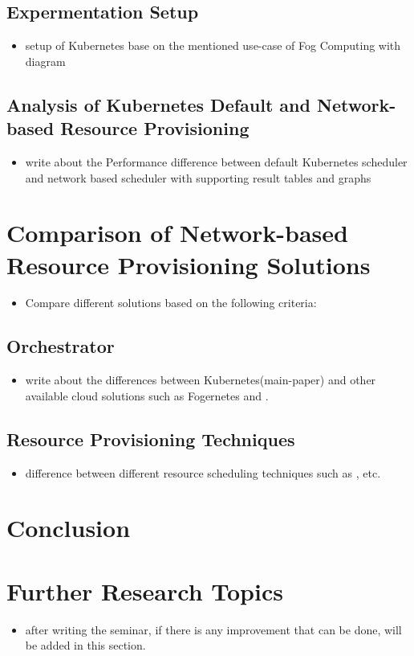\subsection{Expermentation Setup}
\label{sec:setup}
\begin{itemize}
  \item setup of Kubernetes base on the mentioned use-case of Fog Computing with diagram
\end{itemize}

\subsection{Analysis of Kubernetes Default and Network-based Resource Provisioning}
\label{sec:analysis}
\begin{itemize}
  \item write about the Performance difference between default Kubernetes scheduler and network based scheduler with supporting result tables and graphs
\end{itemize}

\section{Comparison of Network-based Resource Provisioning Solutions}
\label{sec:related_work}
\begin{itemize}
  \item Compare different solutions based on the following criteria:
\end{itemize}

\subsection{Orchestrator}
\label{sec:infra}
\begin{itemize}
  \item write about the differences between Kubernetes(main-paper)\cite{Santos2019} and other available cloud solutions such as Fogernetes\cite{Wobker2018} and \cite{Reale}.
\end{itemize}

\subsection{Resource Provisioning Techniques}
\begin{itemize}
  \item difference between different resource scheduling techniques such  as \cite{Bittencourt2017}, \cite{Haja2019} etc.
\end{itemize}

\section{Conclusion}
\label{sec:concl}

\section{Further Research Topics}
\label{sec:research}
\begin{itemize}
  \item after writing the seminar, if there is any improvement that can be done, will be added in this section.
\end{itemize}
